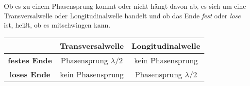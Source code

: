 \documentclass{article}
\begin{document}
Ob es zu einem Phasensprung kommt oder nicht hängt davon ab, es sich um eine Transversalwelle oder Longitudinalwelle handelt und ob das Ende \emph{fest} oder \emph{lose} ist, heißt, ob es mitschwingen kann.
 
\begin{center}
\begin{tabular}{ |c|c|c| }
\hline
   & \textbf{Transversalwelle} & \textbf{Longitudinalwelle} \\
\hline
 \textbf{festes Ende} & Phasensprung $\lambda / 2$ & kein Phasensprung \\
\hline
 \textbf{loses Ende} & kein Phasensprung & Phasensprung $\lambda / 2$ \\
\hline
\end{tabular}
\end{center}
 
\end{document}
